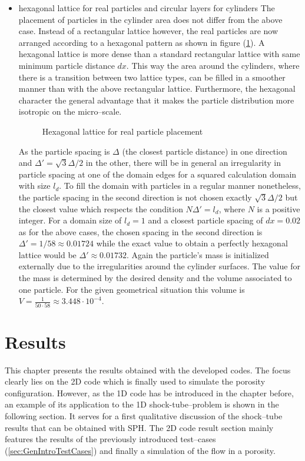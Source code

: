 \documentclass{report}
\begin{document}
\begin{itemize}
\item hexagonal lattice for real particles and circular layers for cylinders
The placement of particles in the cylinder area does not differ from the above case. Instead of a rectangular lattice however, the real particles are now arranged according to a hexagonal pattern  as shown in figure (\ref{fig:HexagonalLattice}). A hexagonal lattice is more dense than a standard rectangular lattice with same minimum particle distance $dx$. This way the area around the cylinders, where there is a transition between two lattice types, can be filled in a smoother manner than with the above rectangular lattice. Furthermore, the hexagonal character the general advantage that 
it makes the particle distribution more isotropic on the micro--scale.

\begin{figure}[!htbp]
  \centering
  \caption{Hexagonal lattice for real particle placement}
  \label{fig:HexagonalLattice}
\end{figure}

As the particle spacing is $\Delta$ (the closest particle distance) in one direction and $\Delta'=\sqrt{3}\Delta/2$ in the other, there will be in general an irregularity in particle spacing at one of the domain edges for a squared calculation domain with size $l_d$. To fill the domain with particles in a regular manner nonetheless, the particle spacing in the second direction is not chosen exactly $\sqrt{3}\Delta/2$ but the closest value which respects the condition $N \Delta'=l_d$, where $N$ is a positive integer. For a domain size of $l_d=1$ and a closest particle spacing of $dx=0.02$ as for the above cases, the chosen spacing in the second direction is $\Delta'=1/58\approx0.01724$ while the exact value to obtain a perfectly hexagonal lattice would be $\Delta'\approx0.01732$. 
Again the particle's mass is initialized externally due to the irregularities around the cylinder surfaces. The value for the mass is determined by the desired density and the volume associated to one particle. For the given geometrical situation this volume is $V=\frac{1}{50\cdot58}\approx3.448\cdot10^{-4}$.

\end{itemize}



\chapter{Results}
\label{sec:Results}
This chapter presents the results obtained with the developed codes. The focus clearly lies on the 2D code which is finally used to simulate the porosity configuration. However, as the 1D code has be introduced in the chapter before, an example of its application to the 1D shock-tube--problem is shown in the following section. It serves for a first qualitative discussion of the shock--tube results that can be obtained with SPH.
The 2D code result section mainly features the results of the previously introduced test--cases (\ref{sec:GenIntroTestCases}) and finally a simulation of the flow in a porosity.
\end{document}

